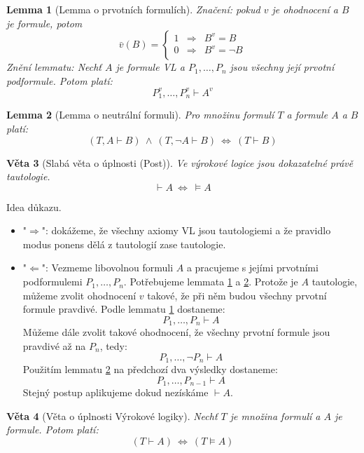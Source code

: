 \documentclass[a4paper]{article}      %
\newtheorem{theorem}{Věta}[section]
\newtheorem{lemma}[theorem]{Lemma}
\newenvironment{proof}[1][Důkaz]{\begin{trivlist}
\item[\hskip \labelsep {\bfseries #1}]}{\end{trivlist}}
\begin{document}
\begin{lemma}[Lemma o prvotních formulích]\label{lemma:prvotni_formule}
Značení: pokud $v$ je ohodnocení a $B$ je formule, potom
\[
\bar{v}(B) = \left\{
\begin{array}{lcl}
1 & \Rightarrow & B^{v} = B\\
0 & \Rightarrow & B^{v} = \neg B\\
\end{array}
\right.
\]
Znění lemmatu: Nechť $A$ je formule VL a $P_{1},\ldots,P_{n}$ jsou všechny její prvotní podformule. Potom
platí:
\[
P_{1}^{v},\ldots,P_{n}^{v} \vdash A^{v}
\]
\end{lemma}

\begin{lemma}[Lemma o neutrální formuli]\label{lemma:neutralni_formule}
Pro množinu formulí $T$ a formule $A$ a $B$ platí:
\[
(T,A \vdash B)\ \wedge\ (T,\neg A \vdash B)\ \Leftrightarrow\ (T \vdash B)
\]
\end{lemma}

\begin{theorem}[Slabá věta o úplnosti (Post)]
Ve výrokové logice jsou dokazatelné právě tautologie.
\[
\vdash A\ \Leftrightarrow\ \models A
\]
\end{theorem}

\begin{proof}
Idea důkazu.
\begin{itemize}
	\item "$\Rightarrow$": dokážeme, že všechny axiomy VL jsou tautologiemi a že pravidlo modus ponens dělá z tautologií zase tautologie.
	\item "$\Leftarrow$": Vezmeme libovolnou formuli $A$ a pracujeme s jejími prvotními podformulemi $P_{1},\ldots,P_{n}$.
Potřebujeme lemmata \ref{lemma:prvotni_formule} a \ref{lemma:neutralni_formule}. Protože je $A$ tautologie, můžeme zvolit ohodnocení $v$
takové, že při něm budou všechny prvotní formule pravdivé. Podle lemmatu \ref{lemma:prvotni_formule} dostaneme:
\[
P_{1},\ldots,P_{n} \vdash A
\]
Můžeme dále zvolit takové ohodnocení, že všechny prvotní formule jsou pravdivé až na $P_{n}$, tedy:
\[
P_{1},\ldots,\neg P_{n} \vdash A
\]
Použitím lemmatu \ref{lemma:neutralni_formule} na předchozí dva výsledky dostaneme:
\[
P_{1},\ldots,P_{n-1} \vdash A
\]
Stejný postup aplikujeme dokud nezískáme $\vdash A$.
\end{itemize}
\end{proof}

\begin{theorem}[Věta o úplnosti Výrokové logiky]
Nechť $T$ je množina formulí a $A$ je formule. Potom platí:
\[
(T \vdash A)\ \Leftrightarrow\ (T \models A)
\]
\end{theorem}
\end{document}
